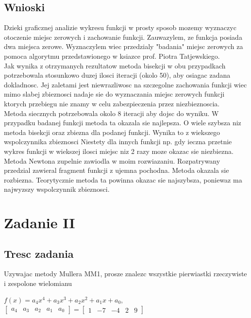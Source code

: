 \documentclass[polish, 11pt, oneside]{article}   	%
\begin{document}
\subsection{Wnioski}
Dzieki graficznej analizie wykresu funkcji w prosty sposob mozemy wyznaczyc otoczenie miejsc zerowych i zachowanie funkcji. Zauwazylem, ze funkcja posiada dwa miejsca zerowe. Wyznaczylem wiec przedzialy "badania" miejsc zerowych za pomoca algorytmu przedstawionego w ksiazce prof. Piotra Tatjewskiego. \\
 Jak wynika z otrzymanych rezultatow metoda bisekcji
w obu przypadkach potrzebowala stosunkowo duzej ilosci iteracji (okolo 50), aby osiagac zadana dokladnosc. Jej
zaletami jest niewrazliwosc na szczegolne zachowania funkcji wiec mimo slabej zbieznosci nadaje sie
do wyznaczania miejsc zerowych funkcji ktorych przebiegu nie znamy w celu zabezpieczenia przez
niezbieznoscia. \\
 Metoda siecznych potrzebowala okolo 8 iteracji aby dojsc do wyniku. W przypadku badanej funkcji metoda ta okazala sie najlepsza. O wiele szybsza niz metoda bisekcji oraz zbiezna dla podanej funkcji. Wynika to z wiekszego wspolczynnika zbieznosci Niestety dla innych funkcji np. gdy ieczna przetnie wykres funkcji w wiekszej ilosci miejsc niz 2 razy moze okazac sie niezbiezna. \\
 Metoda Newtona zupelnie zawiodla w moim rozwiazaniu. Rozpatrywany przedzial zawieral
fragment funkcji z ujemna pochodna. Metoda okazala sie rozbiezna. Teorytycznie metoda ta powinna okazac sie najszybsza, poniewaz ma najwyzszy wspolczynnik zbieznosci.



\section{Zadanie II}
\subsection{Tresc zadania}
Uzywajac metody Mullera MM1, prosze znalezc wszystkie pierwiastki rzeczywiste i zespolone wielomianu
\begin{center}
$f(x) = a_{4}x^4+a_{3}x^3+a_{2}x^2+a_{1}x+a_{0}$,  
$
\left[
\begin{array}{ccccc}
       a_{4} & a_{3} & a_{2} & a_{1} & a_{0}
\end{array}
\right]
=
\left[
\begin{array}{ccccc}
       1 & -7 & -4 & 2 & 9
\end{array}
\right]$
\end{center}
\end{document}
